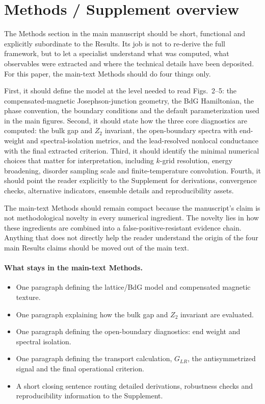 \section*{Methods / Supplement overview}

The Methods section in the main manuscript should be short, functional and explicitly subordinate to the Results. Its job is not to re-derive the full framework, but to let a specialist understand what was computed, what observables were extracted and where the technical details have been deposited. For this paper, the main-text Methods should do four things only.

First, it should define the model at the level needed to read Figs.~2--5: the compensated-magnetic Josephson-junction geometry, the BdG Hamiltonian, the phase convention, the boundary conditions and the default parameterization used in the main figures. Second, it should state how the three core diagnostics are computed: the bulk gap and $Z_2$ invariant, the open-boundary spectra with end-weight and spectral-isolation metrics, and the lead-resolved nonlocal conductance with the final extracted criterion. Third, it should identify the minimal numerical choices that matter for interpretation, including $k$-grid resolution, energy broadening, disorder sampling scale and finite-temperature convolution. Fourth, it should point the reader explicitly to the Supplement for derivations, convergence checks, alternative indicators, ensemble details and reproducibility assets.

The main-text Methods should remain compact because the manuscript's claim is not methodological novelty in every numerical ingredient. The novelty lies in how these ingredients are combined into a false-positive-resistant evidence chain. Anything that does not directly help the reader understand the origin of the four main Results claims should be moved out of the main text.

\paragraph{What stays in the main-text Methods.}
\begin{itemize}
\item One paragraph defining the lattice/BdG model and compensated magnetic texture.
\item One paragraph explaining how the bulk gap and $Z_2$ invariant are evaluated.
\item One paragraph defining the open-boundary diagnostics: end weight and spectral isolation.
\item One paragraph defining the transport calculation, $G_{LR}$, the antisymmetrized signal and the final operational criterion.
\item A short closing sentence routing detailed derivations, robustness checks and reproducibility information to the Supplement.
\end{itemize}


